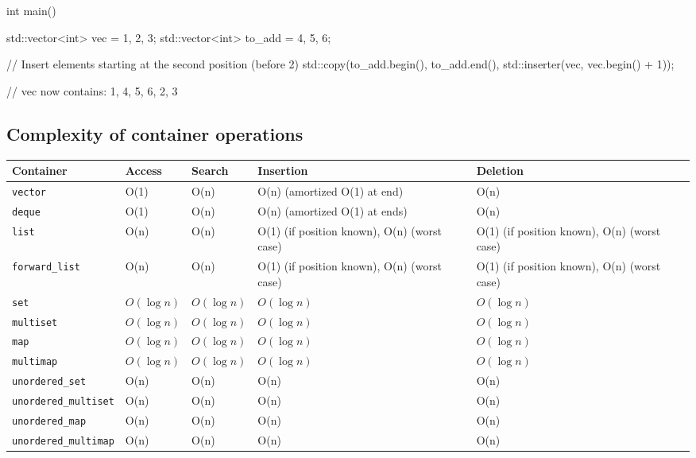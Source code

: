 \documentclass{report}
\begin{document}
\begin{itemize}
\begin{enumerate}
\begin{cppcode}
                        int main() {
                            std::vector<int> vec = {1, 2, 3};
                            std::vector<int> to_add = {4, 5, 6};

                            // Insert elements starting at the second position (before 2)
                            std::copy(to_add.begin(), to_add.end(), std::inserter(vec, vec.begin() + 1));

                            // vec now contains: 1, 4, 5, 6, 2, 3
                        }
                    \end{cppcode}
            \end{enumerate} 
    \end{itemize}

    \pagebreak 
    \subsection{Complexity of container operations}
    \begin{center}
        \begin{tabular}{|>{\raggedright}m{4cm}|>{\centering}m{2.5cm}|>{\centering}m{2.5cm}|>{\centering}m{3cm}|>{\centering\arraybackslash}m{3cm}|}
            \hline
            \textbf{Container} & \textbf{Access} & \textbf{Search} & \textbf{Insertion} & \textbf{Deletion} \\ \hline
            \texttt{vector} & O(1) & O(n) & O(n) (amortized O(1) at end) & O(n) \\ \hline
            \texttt{deque} & O(1) & O(n) & O(n) (amortized O(1) at ends) & O(n) \\ \hline
            \texttt{list} & O(n) & O(n) & O(1) (if position known), O(n) (worst case) & O(1) (if position known), O(n) (worst case) \\ \hline
            \texttt{forward\_list} & O(n) & O(n) & O(1) (if position known), O(n) (worst case) & O(1) (if position known), O(n) (worst case) \\ \hline
            \texttt{set} & $O(\log n)$ & $O(\log n)$ & $O(\log n)$ & $O(\log n)$ \\ \hline
            \texttt{multiset} & $O(\log n)$ & $O(\log n)$ & $O(\log n)$ & $O(\log n)$ \\ \hline
            \texttt{map} & $O(\log n)$ & $O(\log n)$ & $O(\log n)$ & $O(\log n)$ \\ \hline
            \texttt{multimap} & $O(\log n)$ & $O(\log n)$ & $O(\log n)$ & $O(\log n)$ \\ \hline
            \texttt{unordered\_set} & O(n) & O(n) & O(n) & O(n) \\ \hline
            \texttt{unordered\_multiset} & O(n) & O(n) & O(n) & O(n) \\ \hline
            \texttt{unordered\_map} & O(n) & O(n) & O(n) & O(n) \\ \hline
            \texttt{unordered\_multimap} & O(n) & O(n) & O(n) & O(n) \\ \hline
        \end{tabular}
   \end{center}
\end{document}

